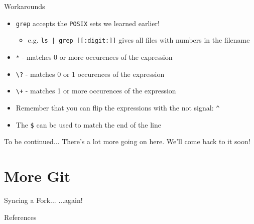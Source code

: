 \documentclass[11pt]{beamer}
\begin{document}
\begin{frame}[fragile]{Workarounds}
  \begin{itemize}[<+- | alert@+>]
    \item \texttt{grep} accepts the \texttt{POSIX} sets we learned earlier!
    \begin{itemize}[<+- | alert@+>]
      \item e.g. \texttt{ls | grep [[:digit:]]} gives all files with numbers in the filename
    \end{itemize}
    \item \texttt{*} \-- matches 0 or more occurences of the expression
    \item \texttt{\textbackslash ?} \-- matches 0 or 1 occurences of the expression
    \item \texttt{\textbackslash +} \-- matches 1 or more occurences of the expression
    \item Remember that you can flip the expressions with the not signal: \texttt{\^{}}
    \item The \texttt{\$} can be used to match the end of the line
  \end{itemize}
\end{frame}

\begin{frame}[fragile]{To be continued...}
  There's a lot more going on here.  We'll come back to it soon!
\end{frame}

%

%
\section{More Git}
\label{sec:more_git}

\begin{frame}[fragile]{Syncing a Fork...}
  ...again!
\end{frame}

%

\begin{frame}[allowframebreaks]{References}
  
  
\end{frame}
\end{document}
